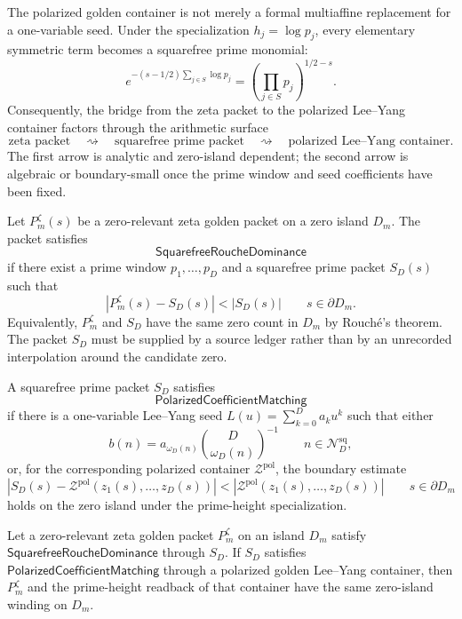 \begin{principle}
\label{prin:rh-polarization-enters-prime-ledger}
The polarized golden container is not merely a formal multiaffine
replacement for a one-variable seed.  Under the specialization
$h_j=\log p_j$, every elementary symmetric term becomes a squarefree
prime monomial:
$$
e^{-(s-1/2)\sum_{j\in S}\log p_j}
=
\left(\prod_{j\in S}p_j\right)^{1/2-s}.
$$
Consequently, the bridge from the zeta packet to the polarized
Lee--Yang container factors through the arithmetic surface
$$
\text{zeta packet}
\quad\rightsquigarrow\quad
\text{squarefree prime packet}
\quad\rightsquigarrow\quad
\text{polarized Lee--Yang container}.
$$
The first arrow is analytic and zero-island dependent; the second arrow
is algebraic or boundary-small once the prime window and seed
coefficients have been fixed.
\end{principle}

\begin{definition}
\label{def:rh-squarefree-rouche-dominance}
Let $P_m^{\zeta}(s)$ be a zero-relevant zeta golden packet on a zero
island $D_m$.  The packet satisfies
$$
\mathsf{SquarefreeRoucheDominance}
$$
if there exist a prime window $p_1,\ldots,p_D$ and a squarefree prime
packet $S_D(s)$ such that
$$
|P_m^{\zeta}(s)-S_D(s)|
<
|S_D(s)|
\qquad
s\in\partial D_m.
$$
Equivalently, $P_m^{\zeta}$ and $S_D$ have the same zero count in
$D_m$ by Rouch\'e's theorem.  The packet $S_D$ must be supplied by a
source ledger rather than by an unrecorded interpolation around the
candidate zero.
\end{definition}

\begin{definition}
\label{def:rh-polarized-coefficient-matching}
A squarefree prime packet $S_D$ satisfies
$$
\mathsf{PolarizedCoefficientMatching}
$$
if there is a one-variable Lee--Yang seed
$L(u)=\sum_{k=0}^D a_k u^k$ such that either
$$
b(n)=a_{\omega_D(n)}
\binom{D}{\omega_D(n)}^{-1}
\qquad
n\in\mathcal N_D^{\mathrm{sq}},
$$
or, for the corresponding polarized container
$\mathcal Z^{\mathrm{pol}}$, the boundary estimate
$$
|S_D(s)-\mathcal Z^{\mathrm{pol}}(z_1(s),\ldots,z_D(s))|
<
|\mathcal Z^{\mathrm{pol}}(z_1(s),\ldots,z_D(s))|
\qquad
s\in\partial D_m
$$
holds on the zero island under the prime-height specialization.
\end{definition}

\begin{theorem}
\label{thm:rh-squarefree-bridge-gives-polarized-capture}
Let a zero-relevant zeta golden packet $P_m^{\zeta}$ on an island $D_m$
satisfy $\mathsf{SquarefreeRoucheDominance}$ through $S_D$.  If $S_D$
satisfies $\mathsf{PolarizedCoefficientMatching}$ through a polarized
golden Lee--Yang container, then $P_m^{\zeta}$ and the prime-height
readback of that container have the same zero-island winding on $D_m$.
\end{theorem}


